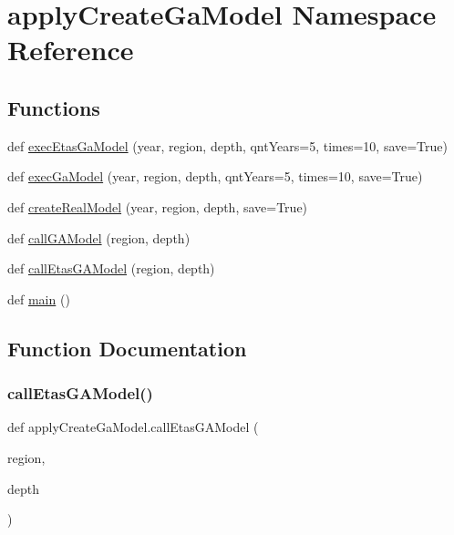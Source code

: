 \hypertarget{namespaceapply_create_ga_model}{}\section{apply\+Create\+Ga\+Model Namespace Reference}
\label{namespaceapply_create_ga_model}
\subsection*{Functions}
\begin{DoxyCompactItemize}
\item 
def \hyperlink{namespaceapply_create_ga_model_a2dd980b3cf61508273c18e2d96034257}{exec\+Etas\+Ga\+Model} (year, region, depth, qnt\+Years=5, times=10, save=True)
\item 
def \hyperlink{namespaceapply_create_ga_model_a8d37832259617b21032ee52669c4e854}{exec\+Ga\+Model} (year, region, depth, qnt\+Years=5, times=10, save=True)
\item 
def \hyperlink{namespaceapply_create_ga_model_a96a0cdc0dba9ffa94749e9b4ed1cdbac}{create\+Real\+Model} (year, region, depth, save=True)
\item 
def \hyperlink{namespaceapply_create_ga_model_a722494b5d31181cb3688c006372c8751}{call\+G\+A\+Model} (region, depth)
\item 
def \hyperlink{namespaceapply_create_ga_model_ac77d1305d00b2acdf71c3efd7b85e2a1}{call\+Etas\+G\+A\+Model} (region, depth)
\item 
def \hyperlink{namespaceapply_create_ga_model_a42e1c23c52dd14e09ed6ff6bb40a9011}{main} ()
\end{DoxyCompactItemize}


\subsection{Function Documentation}
\mbox{\label{namespaceapply_create_ga_model_ac77d1305d00b2acdf71c3efd7b85e2a1}} 
\subsubsection{\texorpdfstring{call\+Etas\+G\+A\+Model()}{callEtasGAModel()}}
{\footnotesize\ttfamily def apply\+Create\+Ga\+Model.\+call\+Etas\+G\+A\+Model (\begin{DoxyParamCaption}\item[{}]{region,  }\item[{}]{depth }\end{DoxyParamCaption})}


